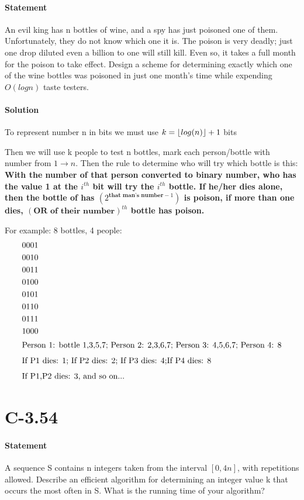 \documentclass{article}
\DeclarePairedDelimiter{\floor}{\lfloor}{\rfloor}
\begin{document}
\paragraph{Statement}
An evil king has n bottles of wine, and a spy has just poisoned one of them. Unfortunately, they do not know which one it is. The poison is very deadly; just one drop diluted even a billion to one will still kill. Even so, it takes a full month for the poison to take effect. Design a scheme for determining exactly which one of the wine bottles was poisoned in just one month’s time while expending $O(logn)$ taste testers.
\paragraph{Solution}
To represent number n in bits we must use $k = \floor {log(n)} + 1$ bits
\par Then we will use k people to test n bottles, mark each person/bottle with number from $1\rightarrow n$. Then the rule to determine who will try which bottle is this: \textbf{With the number of that person converted to binary number, who has the value 1 at the $i^{th}$ bit will try the $i^{th}$ bottle. If he/her dies alone, then the bottle of has  $(2^{\textbf{that man's number}-1})$ is poison, if more than one dies, $(\textbf{OR of their number})^{th}$ bottle has poison.}
\par For example: 8 bottles, 4 people:
  \begin{align*}
    0001\\
    0010\\
    0011\\
    0100\\
    0101\\
    0110\\
    0111\\
    1000\\
    \intertext{Person 1: bottle 1,3,5,7; Person 2: 2,3,6,7; Person 3: 4,5,6,7; Person 4: 8}
    \intertext{If P1 dies: 1; If P2 dies: 2; If P3 dies: 4;If P4 dies: 8}
    \intertext{If P1,P2 dies: 3, and so on...}
  \end{align*}
\section{C-3.54}
\paragraph{Statement}
A sequence S contains n integers taken from the interval $[0,4n]$, with repetitions allowed. Describe an efficient algorithm for determining an integer value k that occurs the most often in S. What is the running time of your algorithm?
\end{document}
